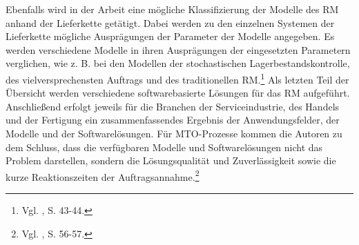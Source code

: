 Ebenfalls wird in der Arbeit eine mögliche Klassifizierung der Modelle des RM anhand der Lieferkette getätigt. Dabei werden zu den einzelnen Systemen der Lieferkette mögliche Ausprägungen der Parameter der Modelle angegeben. Es werden verschiedene Modelle in ihren Ausprägungen der eingesetzten Parametern verglichen, wie z. B. bei den Modellen der stochastischen Lagerbestandskontrolle, des \glqq vielversprechensten Auftrags{\grqq} und des traditionellen RM.\footnote{Vgl. \cite{quante2009revenue}, S. 43-44.} Als letzten Teil der Übersicht werden verschiedene softwarebasierte Lösungen für das RM aufgeführt. Anschließend erfolgt jeweils für die Branchen der Serviceindustrie, des Handels und der Fertigung ein zusammenfassendes Ergebnis der Anwendungsfelder, der Modelle und der Softwarelösungen. Für MTO-Prozesse kommen die Autoren zu dem Schluss, dass die verfügbaren Modelle und Softwarelösungen nicht das Problem darstellen, sondern die Lösungsqualität und Zuverlässigkeit sowie die kurze Reaktionszeiten der Auftragsannahme.\footnote{Vgl. \cite{quante2009revenue}, S. 56-57.}

